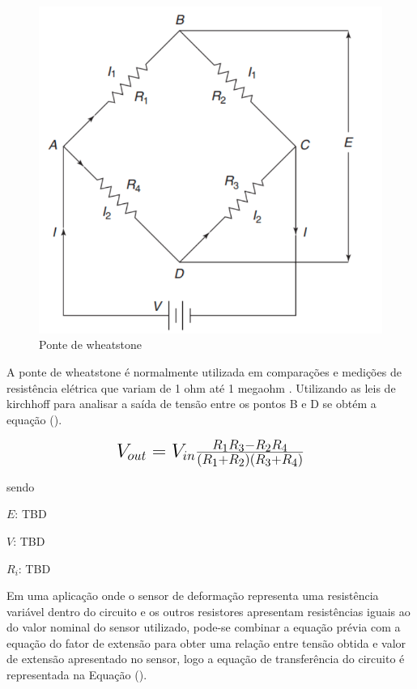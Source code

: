 \begin{figure}[htb]
	\caption{\label{fig:1090} Ponte de wheatstone}
	\begin{center}
		\includegraphics[width=\textwidth]{pictures/1090.png}
	\end{center}
\end{figure}

A ponte de wheatstone é normalmente utilizada em comparações e medições de resistência elétrica que variam de 1 ohm até 1 megaohm \autocite{Hollman2011}. Utilizando as leis de kirchhoff para analisar a saída de tensão entre os pontos B e D se obtém a equação ().

\begin{equation}\label{eq:Eq_220}%
\mbox{\fontsize{17.28}{21.6}\selectfont\( %
V_{out} = V_{in} \frac{R_1R_3 - R_2R_4}{(R_1+R_2)(R_3+R_4)}
\)} %
\end{equation}

sendo

$E$: TBD

$V$: TBD

$R_i$: TBD

\hfill

Em uma aplicação onde o sensor de deformação representa uma resistência variável dentro do circuito e os outros resistores apresentam resistências iguais ao do valor nominal do sensor utilizado, pode-se combinar a equação prévia com a equação do fator de extensão para obter uma relação entre tensão obtida e valor de extensão apresentado no sensor, logo a equação de transferência do circuito é representada na Equação ().

